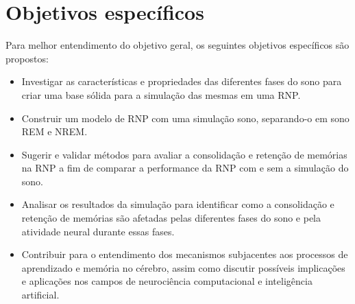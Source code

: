 \section{Objetivos específicos}

Para melhor entendimento do objetivo geral, os seguintes objetivos específicos são propostos:

\begin{itemize}

  \item Investigar as características e propriedades das diferentes fases do sono para criar uma base sólida para a simulação das
mesmas em uma RNP.\@

  \item Construir um modelo de RNP com uma simulação sono, separando-o em sono REM e NREM.

  \item Sugerir e validar métodos para avaliar a consolidação e retenção de memórias na RNP a fim de comparar a performance da
  RNP com e sem a simulação do sono.

  \item  Analisar os resultados da simulação para identificar como a consolidação e retenção de memórias são afetadas pelas
diferentes fases do sono e pela atividade neural durante essas fases.

  \item Contribuir para o entendimento dos mecanismos subjacentes aos processos de aprendizado e memória no cérebro, assim como
discutir possíveis implicações e aplicações nos campos de neurociência computacional e inteligência artificial.

\end{itemize}



